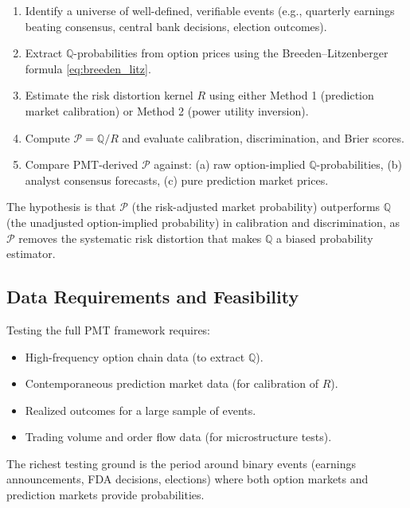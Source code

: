 \documentclass[12pt,a4paper]{article}
\theoremstyle{definition}
\newcommand{\Q}{\mathbb{Q}}
\newcommand{\PP}{\mathcal{P}}
\begin{document}
\begin{enumerate}[label=\textbf{Step \arabic*:}]
    \item Identify a universe of well-defined, verifiable events (e.g., quarterly earnings beating consensus, central bank decisions, election outcomes).
    
    \item Extract $\Q$-probabilities from option prices using the Breeden--Litzenberger formula \eqref{eq:breeden_litz}.
    
    \item Estimate the risk distortion kernel $R$ using either Method 1 (prediction market calibration) or Method 2 (power utility inversion).
    
    \item Compute $\PP = \Q / R$ and evaluate calibration, discrimination, and Brier scores.
    
    \item Compare PMT-derived $\PP$ against: (a) raw option-implied $\Q$-probabilities, (b) analyst consensus forecasts, (c) pure prediction market prices.
\end{enumerate}

The hypothesis is that $\PP$ (the risk-adjusted market probability) outperforms $\Q$ (the unadjusted option-implied probability) in calibration and discrimination, as $\PP$ removes the systematic risk distortion that makes $\Q$ a biased probability estimator.

\subsection{Data Requirements and Feasibility}

Testing the full PMT framework requires:
\begin{itemize}
    \item High-frequency option chain data (to extract $\Q$).
    \item Contemporaneous prediction market data (for calibration of $R$).
    \item Realized outcomes for a large sample of events.
    \item Trading volume and order flow data (for microstructure tests).
\end{itemize}

The richest testing ground is the period around binary events (earnings announcements, FDA decisions, elections) where both option markets and prediction markets provide probabilities.
\end{document}
